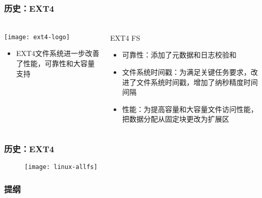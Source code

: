 \begin{frame}[fragile]
	\frametitle{历史：EXT4}
	
	\frametitle{ }
	\begin{columns}[t]
		\begin{column}{.3\textwidth}
			
			\texttt{[image: ext4-logo]}
			\begin{itemize}
				\item EXT4文件系统进一步改善了性能，可靠性和大容量支持
				
			\end{itemize}
			
		\end{column}
		
		\begin{column}{.7\textwidth}			
			EXT4 FS
			\begin{itemize}
				\item 可靠性：添加了元数据和日志{\color{blue}校验和}
				\item 文件系统{\color{blue}时间戳}：为满足关键任务要求，改进了文件系统时间戳，增加了纳秒精度时间间隔
				\item 性能：为提高容量和大容量文件访问性能，把数据分配从固定块更改为{\color{blue}扩展区}
			\end{itemize}
			
		\end{column}
	\end{columns}
	
\end{frame}


\begin{frame}[fragile]
	\frametitle{历史：EXT4}
	\begin{figure}
		\texttt{[image: linux-allfs]}
	\end{figure}

\end{frame}



\begin{frame}
\frametitle{提纲} %
\tableofcontents %
\end{frame}
